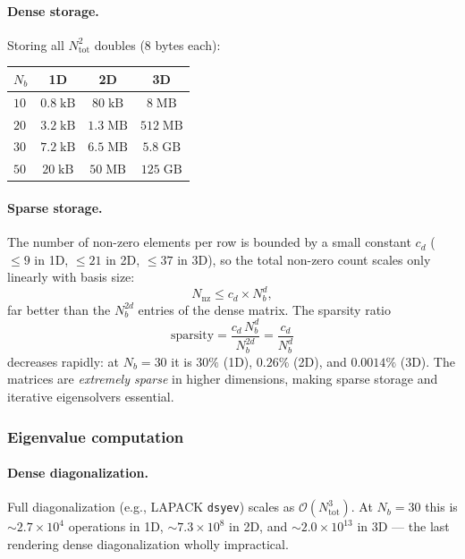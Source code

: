 \paragraph{Dense storage.}
Storing all $N_\mathrm{tot}^2$ doubles (8 bytes each):

\begin{center}
\renewcommand{\arraystretch}{1.3}
\begin{tabular}{lccc}
\toprule
$N_b$ & 1D & 2D & 3D \\
\midrule
$10$ & $0.8\;\mathrm{kB}$ & $80\;\mathrm{kB}$ & $8\;\mathrm{MB}$ \\
$20$ & $3.2\;\mathrm{kB}$ & $1.3\;\mathrm{MB}$ & $512\;\mathrm{MB}$ \\
$30$ & $7.2\;\mathrm{kB}$ & $6.5\;\mathrm{MB}$ & $5.8\;\mathrm{GB}$ \\
$50$ & $20\;\mathrm{kB}$ & $50\;\mathrm{MB}$ & $125\;\mathrm{GB}$ \\
\bottomrule
\end{tabular}
\end{center}

\paragraph{Sparse storage.}
The number of non-zero elements per row is bounded by a small constant $c_d$
($\leq 9$ in 1D, $\leq 21$ in 2D, $\leq 37$ in 3D), so the total non-zero
count scales only linearly with basis size:
\begin{equation}\label{eq:nnz}
    N_\mathrm{nz} \leq c_d \times N_b^d,
\end{equation}
far better than the $N_b^{2d}$ entries of the dense matrix.  The sparsity
ratio
\begin{equation}\label{eq:sparsity}
    \text{sparsity} = \frac{c_d\, N_b^d}{N_b^{2d}} = \frac{c_d}{N_b^d}
\end{equation}
decreases rapidly: at $N_b = 30$ it is $30\%$ (1D), $0.26\%$ (2D), and
$0.0014\%$ (3D).  The matrices are \emph{extremely sparse} in higher
dimensions, making sparse storage and iterative eigensolvers essential.

\subsubsection{Eigenvalue computation}

\paragraph{Dense diagonalization.}
Full diagonalization (e.g., LAPACK \texttt{dsyev}) scales as
$\mathcal{O}(N_\mathrm{tot}^3)$.  At $N_b = 30$ this is
$\sim 2.7 \times 10^4$ operations in 1D,
$\sim 7.3 \times 10^8$ in 2D, and
$\sim 2.0 \times 10^{13}$ in 3D --- the last rendering dense
diagonalization wholly impractical.

